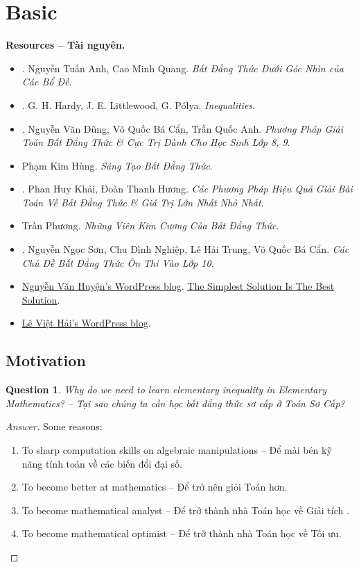 \documentclass{article}
\newtheorem{question}{Question}
\begin{document}
\section{Basic}
\textbf{\textsf{Resources -- Tài nguyên.}}
\begin{itemize}
	\item \cite{Anh_Quang_bdt_lem}. {\sc Nguyễn Tuấn Anh, Cao Minh Quang}. {\it Bất Đẳng Thức Dưới Góc Nhìn của Các Bổ Đề}.
	\item \cite{Hardy_Littlewood_Polya1952}. {\sc G. H. Hardy, J. E. Littlewood, G. P\'{o}lya}. {\it Inequalities}.
	\item \cite{Dung_Can_Anh_bdt_8_9}. {\sc Nguyễn Văn Dũng, Võ Quốc Bá Cẩn, Trần Quốc Anh}. {\it Phương Pháp Giải Toán Bất Đẳng Thức \& Cực Trị Dành Cho Học Sinh Lớp 8, 9}.
	\item {\sc Phạm Kim Hùng}. {\it Sáng Tạo Bất Đẳng Thức}.
	\item \cite{Khai_Huong_bdt}. {\sc Phan Huy Khải, Đoàn Thanh Hương}. {\it Các Phương Pháp Hiệu Quả Giải Bài Toán Về Bất Đẳng Thức \& Giá Trị Lớn Nhất Nhỏ Nhất}.
	\item {\sc Trần Phương}. {\it Những Viên Kim Cương Của Bất Đẳng Thức}.
	\item \cite{Son_Nghiep_Trung_Can_bdt}. {\sc Nguyễn Ngọc Sơn, Chu Đình Nghiệp, Lê Hải Trung, Võ Quốc Bá Cẩn}. {\it Các Chủ Đề Bất Đẳng Thức Ôn Thi Vào Lớp 10}.
	\item \href{https://nguyenhuyenag.wordpress.com/}{{\sc Nguyễn Văn Huyện}'s WordPress blog}. \href{https://mathifc.wordpress.com/}{The Simplest Solution Is The Best Solution}.
	\item \href{https://leviethai.wordpress.com}{{\sc Lê Việt Hải}'s WordPress blog}.
\end{itemize}

\subsection{Motivation}

\begin{question}
	Why do we need to learn elementary inequality in Elementary Mathematics? -- Tại sao chúng ta cần học bất đẳng thức sơ cấp ở Toán Sơ Cấp?
\end{question}

\begin{proof}[Answer]
	Some reasons:
	\begin{enumerate}
		\item To sharp computation skills on algebraic manipulations -- Để mài bén kỹ năng tính toán về các biến đổi đại số.
		\item To become better at mathematics -- Để trở nên giỏi Toán hơn.
		\item To become mathematical analyst -- Để trở thành nhà Toán học về Giải tích .
		\item To become mathematical optimist -- Để trở thành nhà Toán học về Tối ưu.
	\end{enumerate}	
\end{proof}
\end{document}
